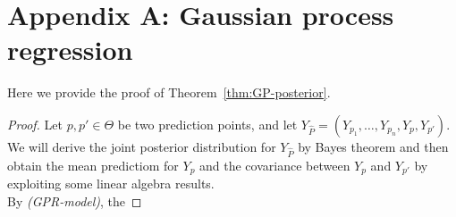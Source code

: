 \section{Appendix A: Gaussian process regression}\label{app:GPR}
Here we provide the proof of Theorem~\ref{thm:GP-posterior}.
\GPpost*
\begin{proof}
    Let $p,p' \in \Theta$ be two prediction points, and let $Y_{\hat{P} } = (Y_{p_1}, \ldots, Y_{p_n}, Y_p, Y_{p'})$. 
    We will derive the joint posterior distribution for $Y_{\hat{P}}$ by Bayes theorem and then obtain the mean predictiom for $Y_p$ and the covariance between $Y_p$ and $Y_{p'}$ by exploiting some linear algebra results. \\
    By \textit{(GPR-model)}, the 

\end{proof}
